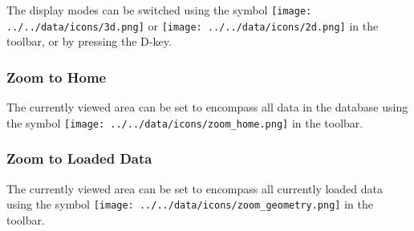 The display modes can be switched using the symbol \texttt{[image: ../../data/icons/3d.png]} or \texttt{[image: ../../data/icons/2d.png]} in the toolbar, or by pressing the D-key. 

\subsubsection{Zoom to Home}

The currently viewed area can be set to encompass all data in the database using the symbol \texttt{[image: ../../data/icons/zoom\_home.png]} in the toolbar.

\subsubsection{Zoom to Loaded Data}

The currently viewed area can be set to encompass all currently loaded data using the symbol \texttt{[image: ../../data/icons/zoom\_geometry.png]} in the toolbar.

